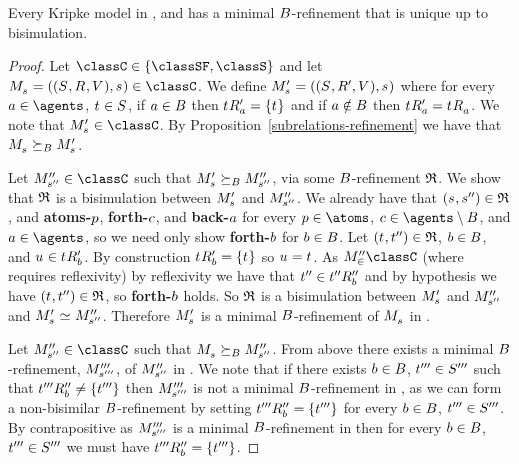 \begin{proposition}\label{minimal-refinement-s4-s5}
Every Kripke model in \classSF{}, and \classS{} has a minimal $B$-refinement that is unique up to bisimulation.
\end{proposition}

\begin{proof}
Let $\classC \in \{\classSF, \classS\}$ and let $\kPModelAndTuple{\kStateS} \in \classC$.
We define $\kPModelP{\kStateS} = ((\kStates, \kAccessibilityP{}, \kValuation), \kStateS)$ where for every $\agentA \in \agents$, $\kStateT \in \kStates$, if $a \in B$ then $\kSuccessorsPA{\kStateT} = \{\kStateT\}$ and if $a \notin B$ then $\kSuccessorsPA{\kStateT} = \kSuccessorsA{\kStateT}$.
We note that $\kPModelP{\kStateS} \in \classC$.
By Proposition~\ref{subrelations-refinement} we have that $\kPModel{\kStateS} \simulatesBs \kPModelP{\kStateS}$.

Let $\kPModelPP{\kStateSPP} \in \classC$ such that $\kPModelP{\kStateS} \simulatesBs \kPModelPP{\kStateSPP}$, via some $B$-refinement $\mathfrak{R}$.
We show that $\mathfrak{R}$ is a bisimulation between $\kPModelP{\kStateS}$ and ${M^{\prime\prime}_{{s}^{\prime\prime}}}$.
We already have that $(\kStateS, \kStateSPP) \in \refinement$, and {\bf atoms-$p$}, {\bf forth-$c$}, and {\bf back-$a$} for every $\atomP \in \atoms$, $\agentC \in \agents \setminus \agentsB$, and $\agentA \in \agents$, so we need only show {\bf forth-$b$} for $b \in B$.
Let $(\kStateT, \kStateTPP) \in \refinement$, $b \in B$, and $\kStateU \in \kSuccessorsPB{\kStateT}$.
By construction $\kSuccessorsPB{\kStateT} = \{\kStateT\}$ so $\kStateU = \kStateT$.
As $\kPModelPP \in \classC$ (where \classC{} requires reflexivity) by reflexivity we have that ${t}^{\prime\prime} \in {{t}^{\prime\prime}} {R^{\prime\prime}_{b}}$ and by hypothesis we have $(\kStateT, \kStateTPP) \in \refinement$, so {\bf forth-$b$} holds.
So $\mathfrak{R}$ is a bisimulation between $\kPModelP{\kStateS}$ and ${M^{\prime\prime}_{{s}^{\prime\prime}}}$ and $\kPModelP{\kStateS} \bisimilar \kPModelPP{\kStateSPP}$.
Therefore $\kPModelP{\kStateS}$ is a minimal $B$-refinement of $\kPModel{\kStateS}$ in \classC{}.

Let $\kPModelPP{\kStateSPP} \in \classC$ such that $\kPModel{\kStateS} \simulatesBs \kPModelPP{\kStateSPP}$.
From above there exists a minimal $B$-refinement, ${M^{\prime\prime\prime}_{{s}^{\prime\prime\prime}}}$, of ${M^{\prime\prime}_{{s}^{\prime\prime}}}$ in \classC{}.
We note that if there exists $b \in B$, ${t}^{\prime\prime\prime} \in {S^{\prime\prime\prime}}$ such that ${{t}^{\prime\prime\prime}} {R^{\prime\prime}_{b}} \neq \{{t}^{\prime\prime\prime}\}$ then ${M^{\prime\prime\prime}_{{s}^{\prime\prime\prime}}}$ is not a minimal $B$-refinement in \classC{}, as we can form a non-bisimilar $B$-refinement by setting ${{t}^{\prime\prime\prime}} {R^{\prime\prime}_{b}} = \{{t}^{\prime\prime\prime}\}$ for every $b \in B$, ${t}^{\prime\prime\prime} \in {S^{\prime\prime\prime}}$.
By contrapositive as ${M^{\prime\prime\prime}_{{s}^{\prime\prime\prime}}}$ is a minimal $B$-refinement in \classC{} then for every $b \in B$, ${t}^{\prime\prime\prime} \in {S^{\prime\prime\prime}}$ we must have ${{t}^{\prime\prime\prime}} {R^{\prime\prime}_{b}} = \{{t}^{\prime\prime\prime}\}$.


\end{proof}
